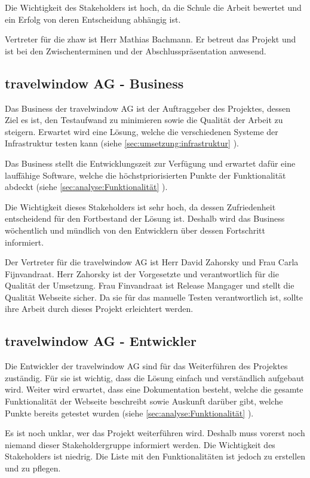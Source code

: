 Die Wichtigkeit des Stakeholders ist hoch, da die Schule die Arbeit bewertet und ein Erfolg von deren Entscheidung abhängig ist.

Vertreter für die \gls{zhaw} ist Herr Mathias Bachmann. Er betreut das Projekt und ist bei den Zwischenterminen und der Abschlusspräsentation anwesend.

\subsection{travelwindow AG - Business}
Das Business der travelwindow AG ist der Auftraggeber des Projektes, dessen Ziel es ist, den Testaufwand zu minimieren sowie die Qualität der Arbeit zu steigern. Erwartet wird eine Lösung, welche die verschiedenen Systeme der Infrastruktur testen kann (siehe \cref{sec:umsetzung:infrastruktur} ).

Das Business stellt die Entwicklungszeit zur Verfügung und erwartet dafür eine lauffähige Software, welche die höchstpriorisierten Punkte der Funktionalität abdeckt (siehe \cref{sec:analyse:Funktionalität} ).

Die Wichtigkeit dieses Stakeholders ist sehr hoch, da dessen Zufriedenheit entscheidend für den Fortbestand der Lösung ist. Deshalb wird das Business wöchentlich und mündlich von den Entwicklern über dessen Fortschritt informiert.

Der Vertreter für die travelwindow AG ist Herr David Zahorsky und Frau Carla Fijnvandraat. Herr Zahorsky ist der Vorgesetzte und verantwortlich für die Qualität der Umsetzung. Frau Finvandraat ist Release Mangager und stellt die Qualität Webseite sicher. Da sie für das manuelle Testen verantwortlich ist, sollte ihre Arbeit durch dieses Projekt erleichtert werden.

\subsection{travelwindow AG - Entwickler}
Die Entwickler der travelwindow AG sind für das Weiterführen des Projektes zuständig. Für sie ist wichtig, dass die Lösung einfach und verständlich aufgebaut wird. Weiter wird erwartet, dass eine Dokumentation besteht, welche die gesamte Funktionalität der Webseite beschreibt sowie Auskunft darüber gibt, welche Punkte bereits getestet wurden (siehe \cref{sec:analyse:Funktionalität} ).

Es ist noch unklar, wer das Projekt weiterführen wird. Deshalb muss vorerst noch niemand dieser Stakeholdergruppe informiert werden. Die Wichtigkeit des Stakeholders ist niedrig. Die Liste mit den Funktionalitäten ist jedoch zu erstellen und zu pflegen.

